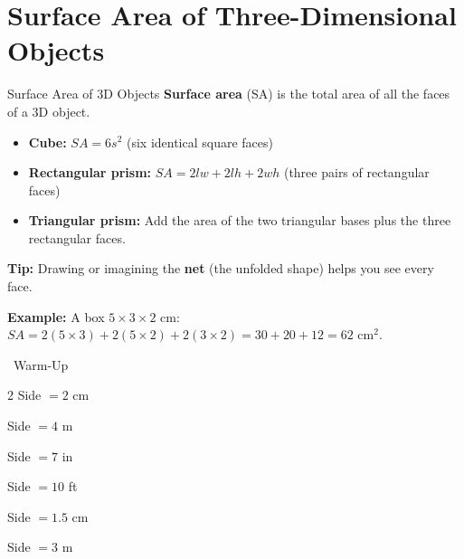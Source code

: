 \section{Surface Area of Three-Dimensional Objects}

\begin{quickReview}{Surface Area of 3D Objects}
\textbf{Surface area} (SA) is the total area of all the faces of a 3D object.

\begin{itemize}[leftmargin=*]
    \item \textbf{Cube:} $SA = 6s^2$ \quad (six identical square faces)
    \item \textbf{Rectangular prism:} $SA = 2lw + 2lh + 2wh$ \quad (three pairs of rectangular faces)
    \item \textbf{Triangular prism:} Add the area of the two triangular bases plus the three rectangular faces.
\end{itemize}

\medskip
\textbf{Tip:} Drawing or imagining the \textbf{net} (the unfolded shape) helps you see every face.

\smallskip
\textbf{Example:} A box $5 \times 3 \times 2$ cm: $SA = 2(5 \times 3) + 2(5 \times 2) + 2(3 \times 2) = 30 + 20 + 12 = 62$ cm$^2$.
\end{quickReview}

\begin{practiceBox}[funGreen]{\faSun~Warm-Up}


\begin{multicols}{2}
\prob Side $= 2$ cm \answerBlank[3cm]

\prob Side $= 4$ m \answerBlank[3cm]

\prob Side $= 7$ in \answerBlank[3cm]

\prob Side $= 10$ ft \answerBlank[3cm]

\prob Side $= 1.5$ cm \answerBlank[3cm]

\prob Side $= 3$ m \answerBlank[3cm]
\end{multicols}
\end{practiceBox}

